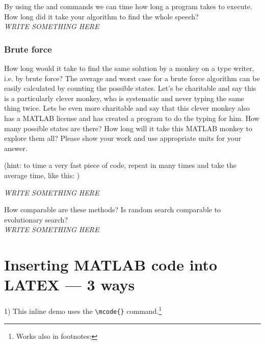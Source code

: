 \documentclass{article}
\begin{document}


By using the  and  commands we can time how long a program takes to execute. How long did it take your algorithm to find the whole speech?\\
\textit{
\color{red}WRITE SOMETHING HERE
}

\newpage
\subsubsection{Brute force}
How long would it take to find the same solution by a monkey on a type writer, i.e. by brute force? The average and worst case for a brute force algorithm can be easily calculated by counting the possible states. Let's be charitable and say this is a particularly clever monkey, who is systematic and never typing the same thing twice. Lets be even more charitable and say that this clever monkey also has a MATLAB license and has created a program to do the typing for him. How many possible states are there? How long will it take this MATLAB monkey to explore them all? Please show your work and use appropriate units for your answer.

(hint: to time a very fast piece of code, repeat in many times and take the average time, like this: )



\textit{
\color{red}WRITE SOMETHING HERE
}

\vspace{3cm}
How comparable are these methods? Is random search comparable to evolutionary search?\\
\textit{
\color{red}WRITE SOMETHING HERE
}






\newpage
\section{Inserting MATLAB code into LATEX --- 3 ways}

1) This inline demo  uses the \verb|\mcode{}| command.\footnote{Works also in footnotes: }
\end{document}
